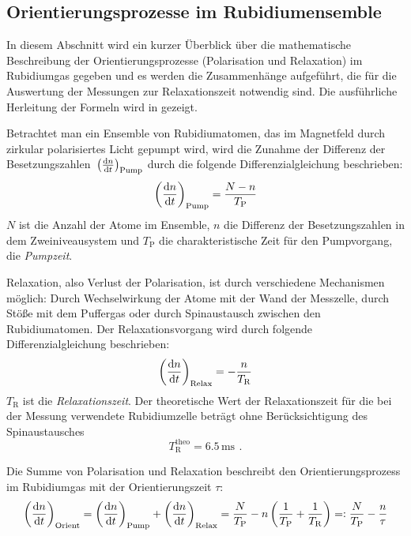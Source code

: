 \subsection{Orientierungsprozesse im Rubidiumensemble}
In diesem Abschnitt wird ein kurzer Überblick über die mathematische Beschreibung der Orientierungsprozesse
(Polarisation und Relaxation) im Rubidiumgas gegeben und es werden die Zusammenhänge aufgeführt, die für die
Auswertung der Messungen zur Relaxationszeit notwendig sind.
Die ausführliche Herleitung der Formeln wird in \cite{staatsex} gezeigt.

Betrachtet man ein Ensemble von Rubidiumatomen, das im Magnetfeld durch zirkular polarisiertes Licht gepumpt wird,
wird die Zunahme der Differenz der Besetzungszahlen~$\left(\frac{\mathrm{d} n}{\mathrm{d} t}\right)_{\text{Pump}}$
durch die folgende Differenzialgleichung beschrieben:
\begin{equation}
    \left(\frac{\mathrm{d} n}{\mathrm{d} t}\right)_{\text{Pump}}=\frac{N-n}{T_\text{P}}
\end{equation}
$N$ ist die Anzahl der Atome im Ensemble, $n$ die Differenz der Besetzungszahlen in dem Zweiniveausystem
und $T_\text{P}$ die charakteristische Zeit für den Pumpvorgang, die \emph{Pumpzeit}.

Relaxation, also Verlust der Polarisation, ist durch verschiedene Mechanismen möglich:
Durch Wechselwirkung der Atome mit der Wand der Messzelle, durch Stöße mit dem Puffergas
oder durch Spinaustausch zwischen den Rubidiumatomen.
Der Relaxationsvorgang wird durch folgende Differenzialgleichung beschrieben:
\begin{equation}
    \left(\frac{\mathrm{d} n}{\mathrm{d} t}\right)_{\text{Relax}}=-\frac{n}{T_\text{R}}
\end{equation}
$T_\text{R}$ ist die \emph{Relaxationszeit}. Der theoretische Wert \cite{staatsex} der Relaxationszeit für die bei der Messung 
verwendete Rubidiumzelle beträgt ohne Berücksichtigung des Spinaustausches
\begin{equation}
    \label{eq:tr:theo}
    T_\text{R}^\text{theo} = 6.5\,\text{ms} \ \, .
\end{equation}

Die Summe von Polarisation und Relaxation beschreibt den Orientierungsprozess im Rubidiumgas mit
der Orientierungszeit $\tau$:
\begin{equation}
    \label{eq:orientierungszeit}
    \left(\frac{\mathrm{d} n}{\mathrm{d} t}\right)_{\text{Orient}}
    =\left(\frac{\mathrm{d} n}{\mathrm{d} t}\right)_{\text{Pump}} + \left(\frac{\mathrm{d} n}{\mathrm{d} t}\right)_{\text{Relax}}
    =\frac{N}{T_\text{P}}-n \left( \frac{1}{T_\text{P}} + \frac{1}{T_\text{R}}\right)
    =:\frac{N}{T_\text{P}}- \frac{n}{\tau}
\end{equation}

